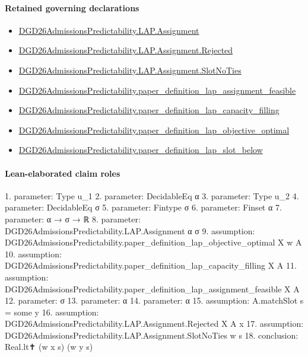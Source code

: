 \documentclass[10pt]{article}
\begin{document}
\paragraph{Retained governing declarations}
\begin{itemize}\raggedright
\item \hyperlink{governing-declaration-a9620f375b9ffc53}{DGD26\allowbreak{}Admissions\allowbreak{}Predictability.\allowbreak{}LAP.\allowbreak{}Assignment}
\item \hyperlink{governing-declaration-111dcd92b14ff900}{DGD26\allowbreak{}Admissions\allowbreak{}Predictability.\allowbreak{}LAP.\allowbreak{}Assignment.\allowbreak{}Rejected}
\item \hyperlink{governing-declaration-9ad3d98d760488d4}{DGD26\allowbreak{}Admissions\allowbreak{}Predictability.\allowbreak{}LAP.\allowbreak{}Assignment.\allowbreak{}Slot\allowbreak{}No\allowbreak{}Ties}
\item \hyperlink{governing-declaration-478232d5e3e1f600}{DGD26\allowbreak{}Admissions\allowbreak{}Predictability.\allowbreak{}paper\_\allowbreak{}definition\_\allowbreak{}lap\_\allowbreak{}assignment\_\allowbreak{}feasible}
\item \hyperlink{governing-declaration-db7390a880816db6}{DGD26\allowbreak{}Admissions\allowbreak{}Predictability.\allowbreak{}paper\_\allowbreak{}definition\_\allowbreak{}lap\_\allowbreak{}capacity\_\allowbreak{}filling}
\item \hyperlink{governing-declaration-d72eb6c77e7e8078}{DGD26\allowbreak{}Admissions\allowbreak{}Predictability.\allowbreak{}paper\_\allowbreak{}definition\_\allowbreak{}lap\_\allowbreak{}objective\_\allowbreak{}optimal}
\item \hyperlink{governing-declaration-819a29e3367c47ca}{DGD26\allowbreak{}Admissions\allowbreak{}Predictability.\allowbreak{}paper\_\allowbreak{}definition\_\allowbreak{}lap\_\allowbreak{}slot\_\allowbreak{}below}
\end{itemize}
\paragraph{Lean-elaborated claim roles}\begin{ReviewVerbatim}
1. parameter: Type u_1
2. parameter: DecidableEq α
3. parameter: Type u_2
4. parameter: DecidableEq σ
5. parameter: Fintype σ
6. parameter: Finset α
7. parameter: α → σ → ℝ
8. parameter: DGD26AdmissionsPredictability.LAP.Assignment α σ
9. assumption: DGD26AdmissionsPredictability.paper_definition_lap_objective_optimal X w A
10. assumption: DGD26AdmissionsPredictability.paper_definition_lap_capacity_filling X A
11. assumption: DGD26AdmissionsPredictability.paper_definition_lap_assignment_feasible X A
12. parameter: σ
13. parameter: α
14. parameter: α
15. assumption: A.matchSlot s = some y
16. assumption: DGD26AdmissionsPredictability.LAP.Assignment.Rejected X A x
17. assumption: DGD26AdmissionsPredictability.LAP.Assignment.SlotNoTies w s
18. conclusion: Real.lt✝ (w x s) (w y s)
\end{ReviewVerbatim}
\end{document}
